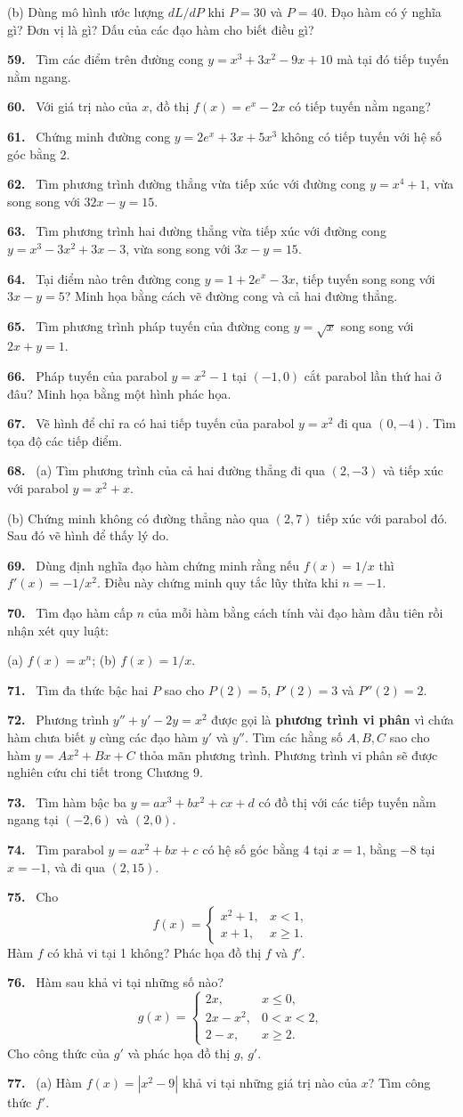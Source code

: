 \documentclass[12pt,a4paper]{article}
\newcommand{\bt}[1]{\par\smallskip\noindent\textbf{#1.}\ }
\begin{document}
(b) Dùng mô hình ước lượng $dL/dP$ khi $P=30$ và $P=40$. Đạo hàm có ý nghĩa gì? Đơn vị là gì? Dấu của các đạo hàm cho biết điều gì?
\bt{59} Tìm các điểm trên đường cong $y=x^3+3x^2-9x+10$ mà tại đó tiếp tuyến nằm ngang.
\bt{60} Với giá trị nào của $x$, đồ thị $f(x)=e^x-2x$ có tiếp tuyến nằm ngang?
\bt{61} Chứng minh đường cong $y=2e^x+3x+5x^3$ không có tiếp tuyến với hệ số góc bằng 2.
\bt{62} Tìm phương trình đường thẳng vừa tiếp xúc với đường cong $y=x^4+1$, vừa song song với $32x-y=15$.
\bt{63} Tìm phương trình hai đường thẳng vừa tiếp xúc với đường cong $y=x^3-3x^2+3x-3$, vừa song song với $3x-y=15$.
\bt{64} Tại điểm nào trên đường cong $y=1+2e^x-3x$, tiếp tuyến song song với $3x-y=5$? Minh họa bằng cách vẽ đường cong và cả hai đường thẳng.
\bt{65} Tìm phương trình pháp tuyến của đường cong $y=\sqrt{x}$ song song với $2x+y=1$.
\bt{66} Pháp tuyến của parabol $y=x^2-1$ tại $(-1,0)$ cắt parabol lần thứ hai ở đâu? Minh họa bằng một hình phác họa.
\bt{67} Vẽ hình để chỉ ra có hai tiếp tuyến của parabol $y=x^2$ đi qua $(0,-4)$. Tìm tọa độ các tiếp điểm.
\bt{68} (a) Tìm phương trình của cả hai đường thẳng đi qua $(2,-3)$ và tiếp xúc với parabol $y=x^2+x$.

(b) Chứng minh không có đường thẳng nào qua $(2,7)$ tiếp xúc với parabol đó. Sau đó vẽ hình để thấy lý do.
\bt{69} Dùng định nghĩa đạo hàm chứng minh rằng nếu $f(x)=1/x$ thì $f'(x)=-1/x^2$. Điều này chứng minh quy tắc lũy thừa khi $n=-1$.
\begin{samepage}
\bt{70} Tìm đạo hàm cấp $n$ của mỗi hàm bằng cách tính vài đạo hàm đầu tiên rồi nhận xét quy luật:

(a) $f(x)=x^n$; \qquad (b) $f(x)=1/x$.
\end{samepage}
\bt{71} Tìm đa thức bậc hai $P$ sao cho $P(2)=5$, $P'(2)=3$ và $P''(2)=2$.
\bt{72} Phương trình $y''+y'-2y=x^2$ được gọi là \textbf{phương trình vi phân} vì chứa hàm chưa biết $y$ cùng các đạo hàm $y'$ và $y''$. Tìm các hằng số $A,B,C$ sao cho hàm $y=Ax^2+Bx+C$ thỏa mãn phương trình. Phương trình vi phân sẽ được nghiên cứu chi tiết trong Chương 9.
\bt{73} Tìm hàm bậc ba $y=ax^3+bx^2+cx+d$ có đồ thị với các tiếp tuyến nằm ngang tại $(-2,6)$ và $(2,0)$.
\bt{74} Tìm parabol $y=ax^2+bx+c$ có hệ số góc bằng 4 tại $x=1$, bằng $-8$ tại $x=-1$, và đi qua $(2,15)$.
\bt{75} Cho
\[f(x)=\begin{cases}x^2+1,&x<1,\\x+1,&x\ge1.\end{cases}\]
Hàm $f$ có khả vi tại 1 không? Phác họa đồ thị $f$ và $f'$.
\bt{76} Hàm sau khả vi tại những số nào?
\[g(x)=\begin{cases}2x,&x\le0,\\2x-x^2,&0<x<2,\\2-x,&x\ge2.\end{cases}\]
Cho công thức của $g'$ và phác họa đồ thị $g$, $g'$.
\bt{77} (a) Hàm $f(x)=|x^2-9|$ khả vi tại những giá trị nào của $x$? Tìm công thức $f'$.
\end{document}

